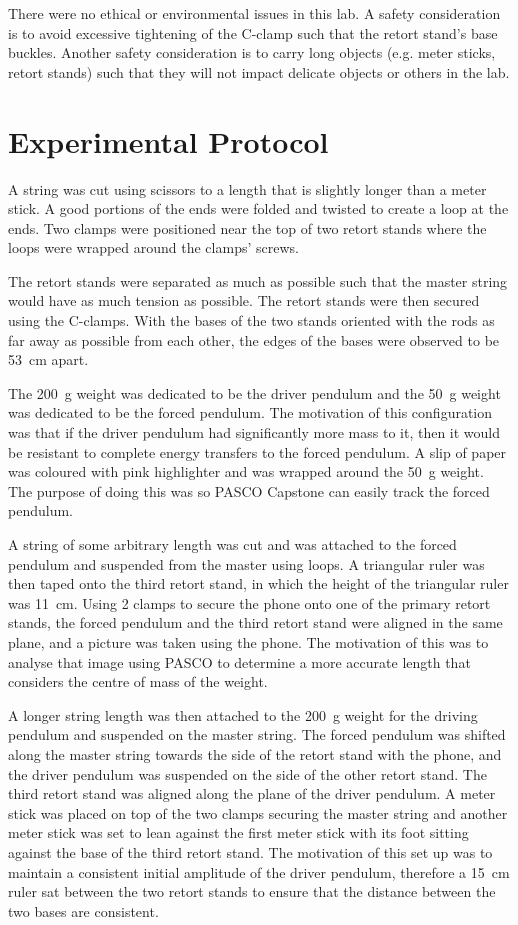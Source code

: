 \documentclass[letterpaper, 12pt]{article}
\begin{document}
There were no ethical or environmental issues in
this lab. A safety consideration is to avoid
excessive tightening of the C-clamp such that
the retort stand's base buckles. Another
safety consideration is to carry long objects
(e.g. meter sticks, retort stands) such that
they will not impact delicate objects
or others in the lab.

\section{Experimental Protocol}

A string was cut using scissors to a length
that is slightly longer than a meter stick.
A good portions of the ends were folded and twisted
to create a loop at the ends. Two clamps were positioned
near the top of two retort stands where the loops were
wrapped around the clamps' screws.


The retort stands were separated
as much as possible such that the
master string would have as much
tension as possible. The retort stands
were then secured using the C-clamps.
With
the bases of the two stands oriented with
the rods as far away as possible from each other,
the edges of the bases were observed to be \SI{53}{cm}
apart.

The \SI{200}{g} weight was dedicated to be the
driver pendulum and the \SI{50}{g} weight was dedicated
to be the forced pendulum. The motivation of this configuration
was that if the driver pendulum had significantly more
mass to it, then it would be resistant to complete
energy transfers to the forced pendulum.
A slip of paper was coloured with pink highlighter
and was wrapped around the \SI{50}{g} weight. The
purpose of doing this was so PASCO Capstone can
easily track the forced pendulum.

A string of some arbitrary length was cut and
was attached to the forced pendulum and suspended
from the master using loops. A triangular ruler
was then taped onto the third retort stand,
in which the height of the triangular ruler was
\SI{11}{cm}. Using 2 clamps to secure the phone onto one
of the primary retort stands, the forced pendulum
and the third retort stand were aligned in the
same plane, and a picture was taken using the phone.
The motivation of this was to analyse
that image using PASCO to determine
a more accurate length that
considers the centre of mass of the weight.

A longer string length was then attached
to the \SI{200}{g} weight for the driving
pendulum and suspended on the master string.
The forced pendulum was shifted along the
master string towards the side of the retort
stand with the phone, and the driver pendulum
was suspended on the side of the other
retort stand. The third retort stand
was aligned along the plane of the
driver pendulum. A meter stick was placed
on top of the two clamps securing the master
string and another meter stick was
set to lean against the first meter stick
with its foot sitting against the base
of the third retort stand. The motivation
of this set up was to maintain a consistent
initial amplitude of the driver
pendulum, therefore a \SI{15}{cm}
ruler sat between the two
retort stands to ensure that the distance between
the two bases are consistent.
\end{document}
